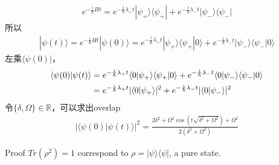 \documentclass[UTF8,12pt]{article} %
\makeatletter
\newenvironment{proof}[1][\protect\proofname]{\par
\normalfont\topsep6\p@\@plus6\p@\relax
\trivlist
\itemindent\parindent
\item[\hskip\labelsep
\scshape
#1]\ignorespaces
}{%
\endtrivlist\@endpefalse
}
\renewcommand{\proofname}{\it{Solution}}
\makeatother
\begin{document}
\begin{proof}[解]
\begin{align}
e^{-\frac{i}{\hbar}Ht} = e^{-\frac{i}{\hbar}\lambda_+t}|\psi_+\rangle\langle\psi_+| + e^{-\frac{i}{\hbar}\lambda_-t}|\psi_-\rangle\langle\psi_-|
\end{align}
所以
\begin{align}
|\psi(t)\rangle = e^{-\frac{i}{\hbar}Ht}|\psi(0)\rangle = e^{-\frac{i}{\hbar}\lambda_+t}|\psi_+\rangle\langle\psi_+|0\rangle + e^{-\frac{i}{\hbar}\lambda_-t}|\psi_-\rangle\langle\psi_-|0\rangle
\end{align}
左乘$\langle\psi(0)|$，
\begin{align}
\langle\psi(0)|\psi(t)\rangle &= e^{-\frac{i}{\hbar}\lambda_+t}\langle0|\psi_+\rangle\langle\psi_+|0\rangle + e^{-\frac{i}{\hbar}\lambda_-t}\langle0|\psi_-\rangle\langle\psi_-|0\rangle \notag\\
&= e^{-\frac{i}{\hbar}\lambda_+t}|\langle0|\psi_+\rangle|^2 + e^{-\frac{i}{\hbar}\lambda_-t}|\langle0|\psi_-\rangle|^2
\end{align}
令$\{\delta,\Omega\}\in\mathbb{R}$，可以求出overlap
\begin{align}
|\langle\psi(0)|\psi(t)\rangle|^2 = \frac{2 \delta ^2+\Omega ^2 \cos \left(t \sqrt{\delta ^2+\Omega ^2}\right)+\Omega ^2}{2 \left(\delta ^2+\Omega ^2\right)}
\end{align} 
\end{proof}

\begin{exercise}{}{}
Proof $Tr(\rho^2)=1$ correspond to $\rho=|\psi\rangle\langle\psi|$, a pure state.
\end{exercise}
\end{document}
